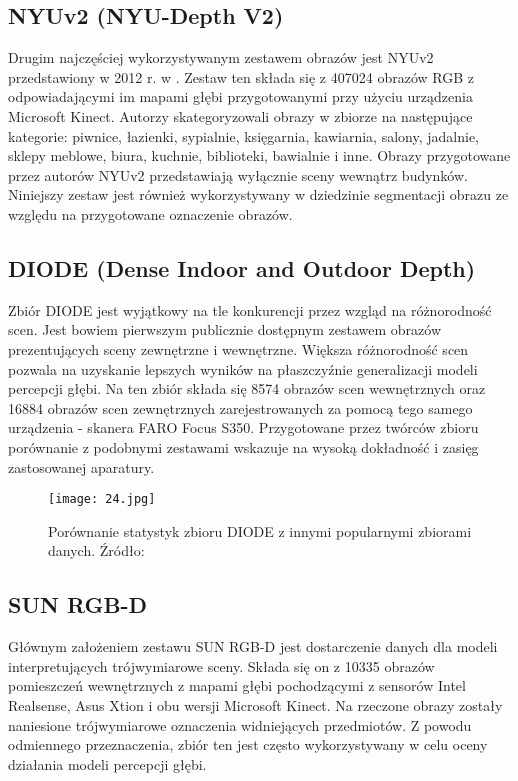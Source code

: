\subsection{NYUv2 (NYU-Depth V2)}
Drugim najczęściej wykorzystywanym zestawem obrazów jest NYUv2 przedstawiony w 2012 r. w \cite{couprie2013}. Zestaw ten składa się z 407024 obrazów RGB z odpowiadającymi im mapami głębi przygotowanymi przy użyciu urządzenia Microsoft Kinect. Autorzy skategoryzowali obrazy w zbiorze na następujące kategorie: piwnice, łazienki, sypialnie, księgarnia, kawiarnia, salony, jadalnie, sklepy meblowe, biura, kuchnie, biblioteki, bawialnie i inne. Obrazy przygotowane przez autorów NYUv2 przedstawiają wyłącznie sceny wewnątrz budynków. Niniejszy zestaw jest również wykorzystywany w dziedzinie segmentacji obrazu ze względu na przygotowane oznaczenie obrazów.
\subsection{DIODE (Dense Indoor and Outdoor Depth)}
Zbiór DIODE \cite{vasiljevic2019} jest wyjątkowy na tle konkurencji przez wzgląd na różnorodność scen. Jest bowiem pierwszym publicznie dostępnym zestawem obrazów prezentujących sceny zewnętrzne i wewnętrzne. Większa różnorodność scen pozwala na uzyskanie lepszych wyników na płaszczyźnie generalizacji modeli percepcji głębi. Na ten zbiór składa się 8574 obrazów scen wewnętrznych oraz 16884 obrazów scen zewnętrznych zarejestrowanych za pomocą tego samego urządzenia - skanera FARO Focus S350. Przygotowane przez twórców zbioru porównanie z podobnymi zestawami wskazuje na wysoką dokładność i zasięg zastosowanej aparatury.
\begin{figure}[H]
    \centering
    \texttt{[image: 24.jpg]}
    \caption{Porównanie statystyk zbioru DIODE z innymi popularnymi zbiorami danych. Źródło: \cite{vasiljevic2019}}
    \label{fig:diode-comparison}
\end{figure}
\subsection{SUN RGB-D}
Głównym założeniem zestawu SUN RGB-D \cite{song2015} jest dostarczenie danych dla modeli interpretujących trójwymiarowe sceny. Składa się on z 10335 obrazów pomieszczeń wewnętrznych z mapami głębi pochodzącymi z sensorów Intel Realsense, Asus Xtion i obu wersji Microsoft Kinect. Na rzeczone obrazy zostały naniesione trójwymiarowe oznaczenia widniejących przedmiotów. Z powodu odmiennego przeznaczenia, zbiór ten jest często wykorzystywany w celu oceny działania modeli percepcji głębi.
